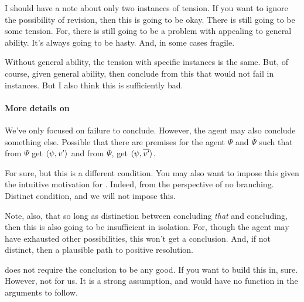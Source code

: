 \begin{note}
  {
    \color{red}
    I should have a note about only two instances of tension.
    If you want to ignore the possibility of revision, then this is going to be okay.
    There is still going to be some tension.
    For, there is still going to be a problem with appealing to general ability.
    It's always going to be hasty.
    And, in some cases fragile.

    Without general ability, the tension with specific instances is the same.
    But, of course, given general ability, then conclude from this that would not fail in instances.
    But I also think this is sufficiently bad.
  }
\end{note}

\paragraph{More details on \iCS{}}

\begin{note}
  We've only focused on failure to conclude.
  However, the agent may also conclude something else.
  Possible that there are premises for the agent \(\Psi\) and \(\overline{\Psi}\) such that from \(\Psi\) get \(\langle \psi, v' \rangle\) and from \(\overline{\Psi}\), get \(\langle \psi, \overline{v'} \rangle\).

  For sure, but this is a different condition.
  You may also want to impose this given the intuitive motivation for \csN{}.
  Indeed, from the perspective of no branching.
  Distinct condition, and we will not impose this.

  Note, also, that so long as distinction between concluding \emph{that} and concluding, then this is also going to be insufficient in isolation.
  For, though the agent may have exhausted other possibilities, this won't get a conclusion.
  And, if not distinct, then a plausible path to positive resolution.
\end{note}

\begin{note}
  \iCS{} does not require the conclusion to be any good.
  If you want to build this in, sure.
  However, not for us.
  It is a strong assumption, and would have no function in the arguments to follow.
\end{note}

